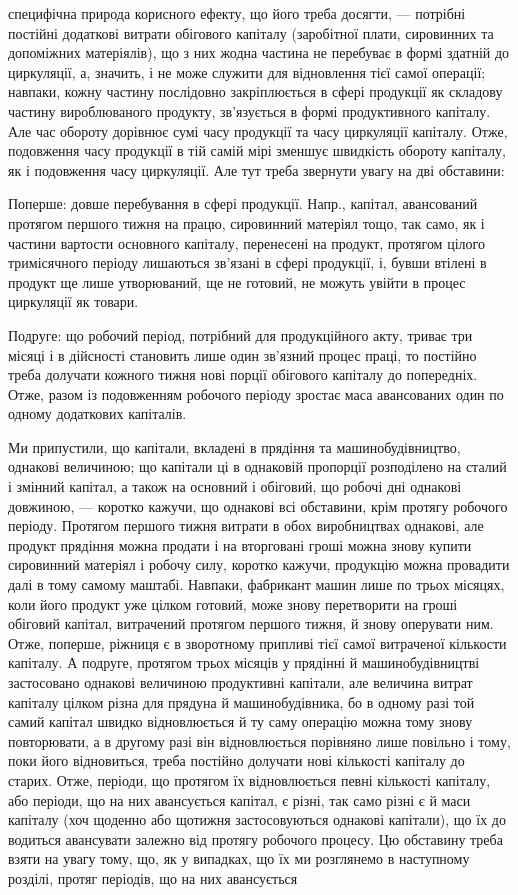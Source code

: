 специфічна природа корисного ефекту, що його треба досягти, — потрібні
постійні додаткові витрати обігового капіталу (заробітної плати, сировинних
та допоміжних матеріялів), що з них жодна частина не перебуває в формі
здатній до циркуляції, а, значить, і не може служити для відновлення тієї
самої операції; навпаки, кожну частину послідовно закріплюється в сфері
продукції як складову частину вироблюваного продукту, зв’язується в
формі продуктивного капіталу. Але час обороту дорівнює сумі часу продукції
та часу циркуляції капіталу. Отже, подовження часу продукції в
тій самій мірі зменшує швидкість обороту капіталу, як і подовження часу
циркуляції. Але тут треба звернути увагу на дві обставини:

Поперше: довше перебування в сфері продукції. Напр., капітал, авансований
протягом першого тижня на працю, сировинний матеріял тощо,
так само, як і частини вартости основного капіталу, перенесені на продукт,
протягом цілого тримісячного періоду лишаються зв’язані в сфері
продукції, і, бувши втілені в продукт ще лише утворюваний, ще не готовий,
не можуть увійти в процес циркуляції як товари.

Подруге: що робочий період, потрібний для продукційного акту, триває
три місяці і в дійсності становить лише один зв’язний процес праці,
то постійно треба долучати кожного тижня нові порції обігового капіталу
до попередніх. Отже, разом із подовженням робочого періоду
зростає маса авансованих один по одному додаткових капіталів.

Ми припустили, що капітали, вкладені в прядіння та машинобудівництво,
однакові величиною; що капітали ці в однаковій пропорції розподілено
на сталий і змінний капітал, а також на основний і обіговий,
що робочі дні однакові довжиною, — коротко кажучи, що однакові всі
обставини, крім протягу робочого періоду. Протягом першого тижня витрати
в обох виробництвах однакові, але продукт прядіння можна продати
і на вторговані гроші можна знову купити сировинний матеріял і
робочу силу, коротко кажучи, продукцію можна провадити далі в тому
самому маштабі. Навпаки, фабрикант машин лише по трьох місяцях, коли
його продукт уже цілком готовий, може знову перетворити на гроші обіговий
капітал, витрачений протягом першого тижня, й знову оперувати
ним. Отже, поперше, ріжниця є в зворотному припливі тієї самої витраченої
кількости капіталу. А подруге, протягом трьох місяців у прядінні
й машинобудівництві застосовано однакові величиною продуктивні капітали,
але величина витрат капіталу цілком різна для прядуна й машинобудівника,
бо в одному разі той самий капітал швидко відновлюється
й ту саму операцію можна тому знову повторювати, а в другому разі
він відновлюється порівняно лише повільно і тому, поки його відновиться,
треба постійно долучати нові кількості капіталу до старих. Отже, періоди,
що протягом їх відновлюється певні кількості капіталу, або періоди,
що на них авансується капітал, є різні, так само різні є й маси капіталу
(хоч щоденно або щотижня застосовуються однакові капітали), що їх до
водиться авансувати залежно від протягу робочого процесу. Цю обставину
треба взяти на увагу тому, що, як у випадках, що їх ми розглянемо
в наступному розділі, протяг періодів, що на них авансується
